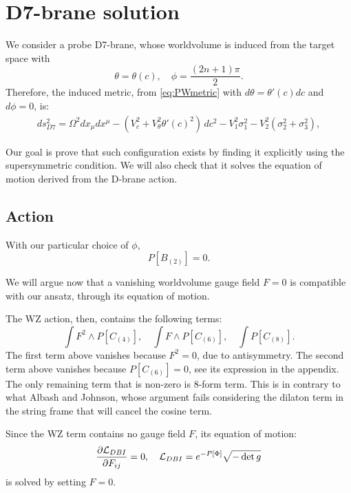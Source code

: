 \section{D7-brane solution}

We consider a probe D7-brane, whose worldvolume is induced from the target space with 
\begin{equation}
 \theta = \theta(c), \quad \phi=\frac{(2 n + 1)\pi}{2}.
\end{equation}
Therefore, the induced metric, from \eqref{eq:PWmetric} with $d\theta = \theta'(c) dc$ and $d\phi=0$, is:
\begin{align}\label{eq:PWmetric}
ds_{D7}^2 =
\Omega^2 dx_\mu dx^\mu 
- (V_c^2 +V_\theta^2 \theta'(c)^2)\, dc^2 - V_1^2 \sigma_1^2 - V_2^2 (\sigma_2^2 + \sigma_3^2),
\end{align}

Our goal is prove that such configuration exists by finding it explicitly using the supersymmetric condition. 
We will also check that it solves the equation of motion derived from the D-brane action.


\subsection{Action}

With our particular choice of $\phi$, 
\begin{equation}
 P[B_{(2)}] = 0.
\end{equation}

We will argue now that a vanishing worldvolume gauge field $F=0$ is compatible with our ansatz, through its equation of motion.

The WZ action, then, contains the following terms:
\begin{equation}
 \int F^2 \wedge P[C_{(4)}], \quad \int F\wedge P[C_{(6)}], \quad \int P[C_{(8)}].
\end{equation}
The first term above vanishes because $F^2=0$, due to antisymmetry. The second term above vanishes because $P[C_{(6)}]=0$, see its expression in the appendix. The only remaining term that is non-zero is 8-form term. 
This is in contrary to what Albash and Johnson, whose argument fails considering the dilaton term in the string frame that will cancel the cosine term.

Since the WZ term contains no gauge field $F$, its equation of motion:
\begin{equation}
 \dfrac{\partial \mathcal{L}_{DBI}}{\partial F_{ij}} = 0, \quad \mathcal{L}_{DBI} = e^{-P[\Phi] } \sqrt{-\det g}
\end{equation}
is solved by setting $F=0$. 

